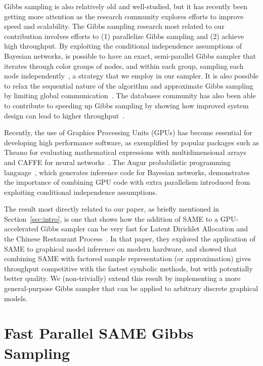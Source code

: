 \documentclass{article} %
\begin{document}
Gibbs sampling is also relatively old and well-studied, but it has recently been getting more
attention as the research community explores efforts to improve speed and scalability. The Gibbs
sampling research most related to our contribution involves efforts to (1) parallelize Gibbs
sampling and (2) achieve high throughput. By exploiting the conditional independence assumptions of
Bayesian networks, is possible to have an exact, semi-parallel Gibbs sampler that iterates through
color groups of nodes, and within each group, sampling each node independently~\citep{Gonzalez2011},
a strategy that we employ in our sampler. It is also possible to relax the sequential nature of the
algorithm and approximate Gibbs sampling by limiting global communication~\citep{Johnson2013}.  The
databases community has also been able to contribute to speeding up Gibbs sampling by showing how
improved system design can lead to higher throughput~\citep{Zhang2013}.

Recently, the use of Graphics Processing Units (GPUs) has become essential for developing high
performance software, as exemplified by popular packages such as Theano for evaluating mathematical
expressions with multidimensional arrays~\citep{Theano2012} and CAFFE for neural
networks~\citep{jia2014caffe}.  The Augur probabilistic programming language~\citep{Augur2014},
which generates inference code for Bayesian networks, demonstrates the importance of combining GPU
code with extra parallelism introduced from exploiting conditional independence assumptions.

The result most directly related to our paper, as briefly mentioned in Section~\ref{sec:intro}, is
one that shows how the addition of SAME to a GPU-accelerated Gibbs sampler can be very fast for
Latent Dirichlet Allocation and the Chinese Restaurant Process~\citep{SAME2015}. In that paper, they
explored the application of SAME to graphical model inference on modern hardware, and showed that
combining SAME with factored sample representation (or approximation) gives throughput competitive
with the fastest symbolic methods, but with potentially better quality. We (non-trivially) extend
this result by implementing a more general-purpose Gibbs sampler that can be applied to arbitrary
discrete graphical models.





\section{Fast Parallel SAME Gibbs Sampling}\label{sec:same}
\end{document}
